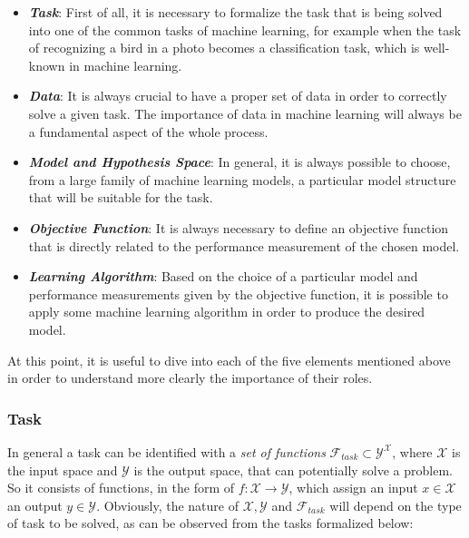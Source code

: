 \begin{itemize}
      \item \emph{\textbf{Task}}: First of all, it is necessary to formalize
            the task that is being solved into one of the common tasks of
            machine learning, for example when the task of recognizing
            a bird in a photo becomes a classification task, which is well-known
            in machine learning.
      \item \emph{\textbf{Data}}: It is always crucial to have a proper set of
            data in order to correctly solve a given task. The importance of
            data in machine learning will always be a fundamental aspect of the
            whole process.
      \item \emph{\textbf{Model and Hypothesis Space}}: In general, it is always
            possible to choose, from a large family of machine learning models,
            a particular model structure that will be suitable for the task.
      \item \emph{\textbf{Objective Function}}: It is always necessary to define an objective
            function that is directly related to the performance measurement of the
            chosen model.
      \item \emph{\textbf{Learning Algorithm}}: Based on the choice of a particular
            model and performance measurements given by the objective function, it
            is possible to apply some machine learning algorithm in order to produce
            the desired model.
\end{itemize}

At this point, it is useful to dive into each of the five elements mentioned above
in order to understand more clearly the importance of their roles.

\subsubsection{Task}

In general a task can be identified with a \emph{set of functions}
$\mathcal{F}_{task} \subset \mathcal{Y}^{\mathcal{X}}$, where ${\mathcal{X}}$
is the input space and ${\mathcal{Y}}$ is the output space,
that can potentially solve a problem. So it consists of functions, in the form of
$f : {\mathcal{X}} \rightarrow {\mathcal{Y}}$, which assign an input
$x \in \mathcal{X}$ an output $y \in \mathcal{Y}$. Obviously, the nature of
$\mathcal{X}, \mathcal{Y}$ and $\mathcal{F}_{task}$ will depend on the type of task
to be solved, as can be observed from the tasks formalized below:

